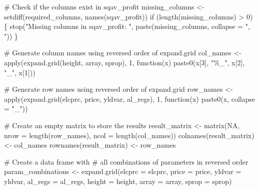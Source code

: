 \documentclass[
  letterpaper,
  DIV=11,
  numbers=noendperiod]{scrartcl}
\newenvironment{Shaded}{\begin{snugshade}}{\end{snugshade}}
\newcommand{\AttributeTok}[1]{\textcolor[rgb]{0.40,0.45,0.13}{#1}}
\newcommand{\CommentTok}[1]{\textcolor[rgb]{0.37,0.37,0.37}{#1}}
\newcommand{\ConstantTok}[1]{\textcolor[rgb]{0.56,0.35,0.01}{#1}}
\newcommand{\ControlFlowTok}[1]{\textcolor[rgb]{0.00,0.23,0.31}{#1}}
\newcommand{\DecValTok}[1]{\textcolor[rgb]{0.68,0.00,0.00}{#1}}
\newcommand{\FunctionTok}[1]{\textcolor[rgb]{0.28,0.35,0.67}{#1}}
\newcommand{\NormalTok}[1]{\textcolor[rgb]{0.00,0.23,0.31}{#1}}
\newcommand{\OtherTok}[1]{\textcolor[rgb]{0.00,0.23,0.31}{#1}}
\newcommand{\SpecialCharTok}[1]{\textcolor[rgb]{0.37,0.37,0.37}{#1}}
\newcommand{\StringTok}[1]{\textcolor[rgb]{0.13,0.47,0.30}{#1}}
\begin{document}
\begin{Shaded}
\begin{Highlighting}[]
\CommentTok{\# Check if the columns exist in sqav\_profit}
\NormalTok{missing\_columns }\OtherTok{\textless{}{-}} \FunctionTok{setdiff}\NormalTok{(required\_columns, }
                           \FunctionTok{names}\NormalTok{(sqav\_profit))}
\ControlFlowTok{if}\NormalTok{ (}\FunctionTok{length}\NormalTok{(missing\_columns) }\SpecialCharTok{\textgreater{}} \DecValTok{0}\NormalTok{) \{}
  \FunctionTok{stop}\NormalTok{(}\StringTok{"Missing columns in sqav\_profit: "}\NormalTok{,}
       \FunctionTok{paste}\NormalTok{(missing\_columns, }\AttributeTok{collapse =} \StringTok{", "}\NormalTok{))}
\NormalTok{\}}

\CommentTok{\# Generate column names using reversed order of expand.grid}
\NormalTok{col\_names }\OtherTok{\textless{}{-}} \FunctionTok{apply}\NormalTok{(}\FunctionTok{expand.grid}\NormalTok{(height, array, sprop), }\DecValTok{1}\NormalTok{,}
                   \ControlFlowTok{function}\NormalTok{(x) }\FunctionTok{paste0}\NormalTok{(x[}\DecValTok{3}\NormalTok{], }\StringTok{"\%\_"}\NormalTok{, x[}\DecValTok{2}\NormalTok{], }\StringTok{"\_"}\NormalTok{, x[}\DecValTok{1}\NormalTok{]))}

\CommentTok{\# Generate row names using reversed order of expand.grid}
\NormalTok{row\_names }\OtherTok{\textless{}{-}} \FunctionTok{apply}\NormalTok{(}\FunctionTok{expand.grid}\NormalTok{(elcprc, }
\NormalTok{                               price,}
\NormalTok{                               yldvar, }
\NormalTok{                               al\_regs), }\DecValTok{1}\NormalTok{, }
                   \ControlFlowTok{function}\NormalTok{(x) }\FunctionTok{paste0}\NormalTok{(x, }\AttributeTok{collapse =} \StringTok{"\_"}\NormalTok{))}

\CommentTok{\# Create an empty matrix to store the results}
\NormalTok{result\_matrix }\OtherTok{\textless{}{-}} \FunctionTok{matrix}\NormalTok{(}\ConstantTok{NA}\NormalTok{, }\AttributeTok{nrow =} \FunctionTok{length}\NormalTok{(row\_names), }
                        \AttributeTok{ncol =} \FunctionTok{length}\NormalTok{(col\_names))}
\FunctionTok{colnames}\NormalTok{(result\_matrix) }\OtherTok{\textless{}{-}}\NormalTok{ col\_names}
\FunctionTok{rownames}\NormalTok{(result\_matrix) }\OtherTok{\textless{}{-}}\NormalTok{ row\_names}

\CommentTok{\# Create a data frame with }
\CommentTok{\# all combinations of parameters in reversed order}
\NormalTok{param\_combinations }\OtherTok{\textless{}{-}} \FunctionTok{expand.grid}\NormalTok{(}\AttributeTok{elcprc =}\NormalTok{ elcprc, }
                                  \AttributeTok{price =}\NormalTok{ price, }
                                  \AttributeTok{yldvar =}\NormalTok{ yldvar, }
                                  \AttributeTok{al\_regs =}\NormalTok{ al\_regs,}
                                  \AttributeTok{height =}\NormalTok{ height, }
                                  \AttributeTok{array =}\NormalTok{ array, }
                                  \AttributeTok{sprop =}\NormalTok{ sprop)}


\end{Highlighting}
\end{Shaded}
\end{document}
